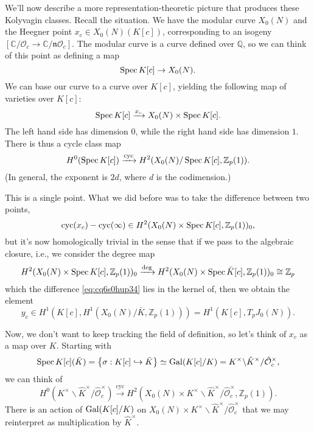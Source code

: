 \documentclass[reqno]{amsart} 
\begin{document}
We'll now describe a more representation-theoretic picture that produces these Kolyvagin classes.  Recall the situation.  We have the modular curve $X_0(N)$ and the Heegner point $x_c \in X_0(N)(K[c])$, corresponding to an isogeny $[\mathbb{C} / \mathcal{O}_c \rightarrow \mathbb{C} / \mathfrak{n} \mathcal{O}_c]$.  The modular curve is a curve defined over $\mathbb{Q}$, so we can think of this point as defining a map
\begin{equation*}
  \operatorname{Spec} K[c] \rightarrow X_0(N).
\end{equation*}
We can base our curve to a curve over $K[c]$, yielding the following map of varieties over $K [c]$:
\begin{equation*}
  \operatorname{Spec} K[c] \xrightarrow{x_c} X_0(N) \times \operatorname{Spec} K[c].
\end{equation*}
The left hand side has dimension $0$, while the right hand side has dimension $1$.  There is thus a cycle class map
\begin{equation*}
  H^0(\operatorname{Spec} K[c])
  \xrightarrow{\mathrm{cyc}}
  H^{2}(X_0(N) / \operatorname{Spec} K[c], \mathbb{Z}_p(1)).
\end{equation*}
(In general, the exponent is $2 d$, where $d$ is the codimension.)

This is a single point.  What we did before was to take the difference between two points,
\begin{equation}\label{eq:cq6s0hup34}
  \operatorname{cyc}(x_c) - \operatorname{cyc}(\infty) \in
  H^2(X_0(N) \times \operatorname{Spec} K[c], \mathbb{Z}_p(1))_0,
\end{equation}
but it's now homologically trivial in the sense that if we pass to the algebraic closure, i.e., we consider the degree map
\begin{equation*}
  H^2(X_0(N) \times \operatorname{Spec} K[c], \mathbb{Z}_p(1))_0
  \xrightarrow{\deg}
  H^2(X_0(N) \times \operatorname{Spec} \bar{K}[c], \mathbb{Z}_p(1))_0
  \cong \mathbb{Z}_p
\end{equation*}
which the difference \eqref{eq:cq6s0hup34} lies in the kernel of, then we obtain the element
\begin{equation*}
  y_c \in
  H^1(K[c], H^1(X_0(N) / \bar{K}, \mathbb{Z}_p(1)))
  =H^1(K[c], T_p J_0(N)).
\end{equation*}

Now, we don't want to keep tracking the field of definition, so let's think of $x_c$ as a map over $K$.  Starting with
\begin{equation*}
  \operatorname{Spec} K[c](\bar{K})
  = \left\{ \sigma : K[c] \hookrightarrow \bar{K} \right\} \simeq \operatorname{Gal}(K[c] / K)
  = K^\times \backslash \hat{K}^\times / \hat{\mathcal{O}}_c^\times,
\end{equation*}
we can think of
\begin{equation*}
  H^0(K^\times \backslash \hat{K}^\times / \hat{\mathcal{O}}_c^\times)
  \xrightarrow{\mathrm{cyc}}
  H^2(X_0(N) \times K^\times \backslash \hat{K}^\times / \hat{\mathcal{O}}_c^\times,
  \mathbb{Z}_p(1)).
\end{equation*}
There is an action of $\operatorname{Gal}(K[c] / K)$ on $X_0(N) \times K^\times \backslash \hat{K}^\times / \hat{\mathcal{O}}_c^\times$ that we may reinterpret as multiplication by $\hat{K}^\times$.
\end{document}

